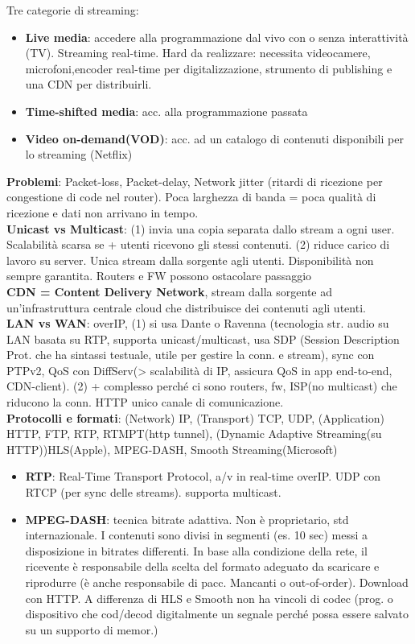 \documentclass[8pt,a4paper]{article}
\begin{document}
\begin{multicols}{5}
    \noindent Tre categorie di streaming:
    \begin{itemize}
      \item \textbf{Live media}: accedere alla programmazione dal vivo con o senza interattività (TV). Streaming real-time. Hard da realizzare: necessita videocamere, microfoni,encoder real-time per digitalizzazione, strumento di publishing e una CDN per distribuirli.
      \item \textbf{Time-shifted media}: acc. alla programmazione passata
      \item \textbf{Video on-demand(VOD)}: acc. ad un catalogo di contenuti disponibili per lo streaming (Netflix)
    \end{itemize}
    \textbf{Problemi}: Packet-loss, Packet-delay, Network jitter (ritardi di ricezione per congestione di code nel router). Poca larghezza di banda = poca qualità di ricezione e dati non arrivano in tempo.\\
    \textbf{Unicast vs Multicast}: (1) invia una copia separata dallo stream a ogni user. Scalabilità scarsa se + utenti ricevono gli stessi contenuti. (2) riduce carico di lavoro su server. Unica stream dalla sorgente agli utenti. Disponibilità non sempre garantita. Routers e FW possono ostacolare passaggio\\
    \textbf{CDN = Content Delivery Network}, stream dalla sorgente ad un’infrastruttura centrale cloud che distribuisce dei contenuti agli utenti.\\
    \textbf{LAN vs WAN}: overIP, (1) si usa Dante o Ravenna (tecnologia str. audio su LAN basata su RTP, supporta unicast/multicast, usa SDP (Session Description Prot. che ha sintassi testuale, utile per gestire la conn. e stream), sync con PTPv2, QoS con DiffServ(> scalabilità di IP, assicura QoS in app end-to-end, CDN-client). (2) + complesso perché ci sono routers, fw, ISP(no multicast) che riducono la conn. HTTP unico canale di comunicazione.\\
    \textbf{Protocolli e formati}: (Network) IP, (Transport) TCP, UDP, (Application) HTTP, FTP, RTP, RTMPT(http tunnel), (Dynamic Adaptive Streaming(su HTTP))HLS(Apple), MPEG-DASH, Smooth Streaming(Microsoft) 
    \begin{itemize}
      \item \textbf{RTP}: Real-Time Transport Protocol, a/v in real-time overIP. UDP con RTCP (per sync delle streams). supporta multicast.
      \item \textbf{MPEG-DASH}: tecnica bitrate adattiva. Non è proprietario, std internazionale. I contenuti sono divisi in segmenti (es. 10 sec) messi a disposizione in bitrates differenti. In base alla condizione della rete, il ricevente è responsabile della scelta del formato adeguato da scaricare e riprodurre (è anche responsabile di pacc. Mancanti o out-of-order). Download con HTTP. A differenza di HLS e Smooth non ha vincoli di codec (prog. o dispositivo che cod/decod digitalmente un segnale perché possa essere salvato su un supporto di memor.)
    \end{itemize}


\end{multicols}
\end{document}
